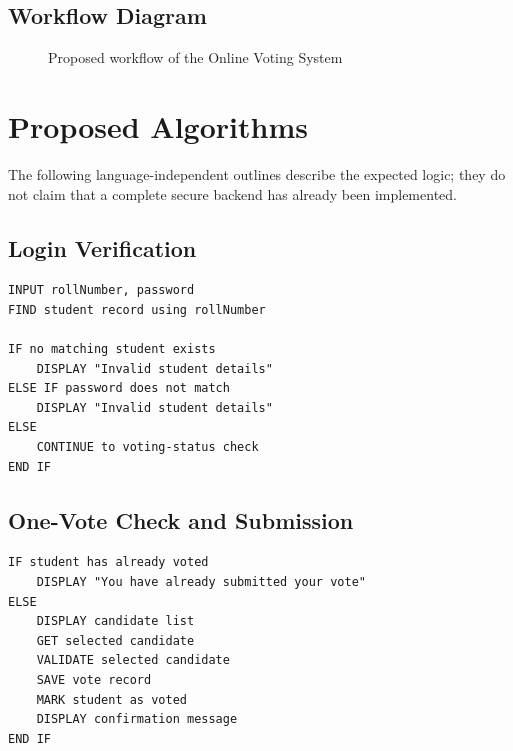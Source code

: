 \documentclass[12pt,a4paper]{report}
\begin{document}
\section{Workflow Diagram}
\begin{figure}[htbp]\centering
{}
\caption{Proposed workflow of the Online Voting System}
\end{figure}

\chapter{Proposed Algorithms}
The following language-independent outlines describe the expected logic; they do not claim that a complete secure backend has already been implemented.
\section{Login Verification}
\begin{lstlisting}
INPUT rollNumber, password
FIND student record using rollNumber

IF no matching student exists
    DISPLAY "Invalid student details"
ELSE IF password does not match
    DISPLAY "Invalid student details"
ELSE
    CONTINUE to voting-status check
END IF
\end{lstlisting}
\section{One-Vote Check and Submission}
\begin{lstlisting}
IF student has already voted
    DISPLAY "You have already submitted your vote"
ELSE
    DISPLAY candidate list
    GET selected candidate
    VALIDATE selected candidate
    SAVE vote record
    MARK student as voted
    DISPLAY confirmation message
END IF
\end{lstlisting}
\end{document}
